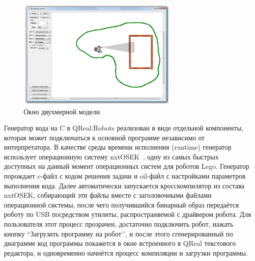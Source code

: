\documentclass[a4paper]{article}
\begin{document}
{\begin{figure} [ht]
  \begin{center}
    \includegraphics[width=0.7\textwidth]{2dModel.png}
    \caption{Окно двухмерной модели}
    \label{2dModel}
  \end{center}
\end{figure}

Генератор кода на C в QReal:Robots реализован в виде отдельной компоненты, которая может подключаться к основной программе независимо от интерпретатора. В качестве среды времени исполнения (runtime) генератор использует операционную систему nxtOSEK~\cite{nxtOsek}, одну из самых быстрых доступных на данный момент операционных систем для роботов Lego. Генератор порождает c-файл с кодом решения задачи и oil-файл с настройками параметров выполнения кода. Далее автоматически запускается кросскомпилятор из состава nxtOSEK, собирающий эти файлы вместе с заголовочными файлами операционной системы, после чего получившийся бинарный образ передаётся роботу по USB посредством утилиты, распространяемой с драйвером робота. Для пользователя этот процесс прозрачен, достаточно подключить робот, нажать кнопку ``Загрузить программу на робот’’, и после этого сгенерированный по диаграмме код программы покажется в окне встроенного в QReal текстового редактора, и одновременно начнётся процесс компиляции и загрузки программы.

}
\end{document}
